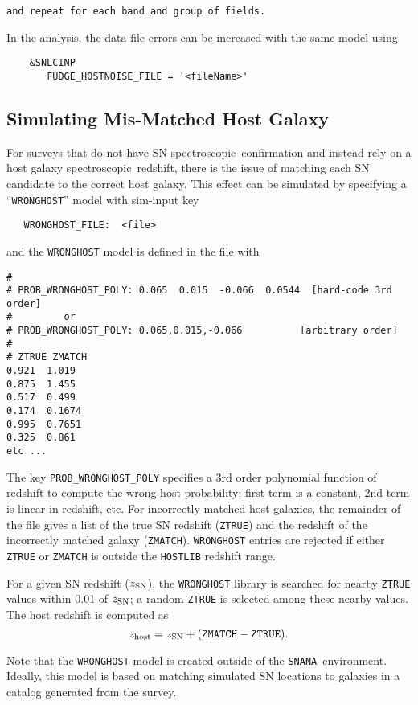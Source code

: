 \documentclass[12pt]{article}
\newcommand{\snana}{{\tt SNANA}}
\newcommand{\spec}{spectroscopic}
\begin{document}
{\begin{Verbatim}[frame=single]
and repeat for each band and group of fields.
\end{Verbatim}
%
In the analysis, the data-file errors can be increased
with the same model using
\begin{verbatim}
    &SNLCINP
       FUDGE_HOSTNOISE_FILE = '<fileName>'
\end{verbatim}


   \clearpage
   \subsection{Simulating Mis-Matched Host Galaxy}
   \label{subsec:sim_wronghost}

For surveys that do not have SN \spec\ confirmation and instead
rely on a host galaxy \spec\ redshift, there is the issue of
matching each SN candidate to the correct host galaxy. 
This effect can be simulated by specifying a ``{\tt WRONGHOST}'' 
model with sim-input key 
%
\begin{verbatim}
   WRONGHOST_FILE:  <file> 
\end{verbatim}
%
and the {\tt WRONGHOST}  model is defined in the file with
%
\begin{Verbatim}[frame=single]
#
# PROB_WRONGHOST_POLY: 0.065  0.015  -0.066  0.0544  [hard-code 3rd order]
#         or
# PROB_WRONGHOST_POLY: 0.065,0.015,-0.066          [arbitrary order]
#
# ZTRUE ZMATCH 
0.921  1.019
0.875  1.455
0.517  0.499
0.174  0.1674
0.995  0.7651
0.325  0.861 
etc ...
\end{Verbatim}
%
The key {\tt PROB\_WRONGHOST\_POLY} specifies a 3rd order
polynomial function of redshift to compute the wrong-host
probability; first term is a constant, 2nd term is linear in redshift, etc.
For incorrectly matched host galaxies, the remainder of the file 
gives a list of the true SN redshift
({\tt ZTRUE}) and the redshift of the incorrectly matched
galaxy ({\tt ZMATCH}).
{\tt WRONGHOST} entries are rejected if either {\tt ZTRUE}
or {\tt ZMATCH} is outside the {\tt HOSTLIB} redshift range.

\newcommand{\zSN}{z_{\rm SN}}
\newcommand{\zHOST}{z_{\rm host}}
For a given SN redshift ($\zSN$), the {\tt WRONGHOST} library is 
searched for nearby {\tt ZTRUE} values within 0.01 of $\zSN$;
a random {\tt ZTRUE} is selected among these nearby values.
The host redshift is computed as
  $$ \zHOST = \zSN + ({\rm\tt ZMATCH - ZTRUE}). $$


Note that the {\tt WRONGHOST} model is created outside
of the \snana\ environment. 
Ideally, this model is based on matching simulated SN 
locations to galaxies in a catalog generated from the survey.


}
\end{document}
